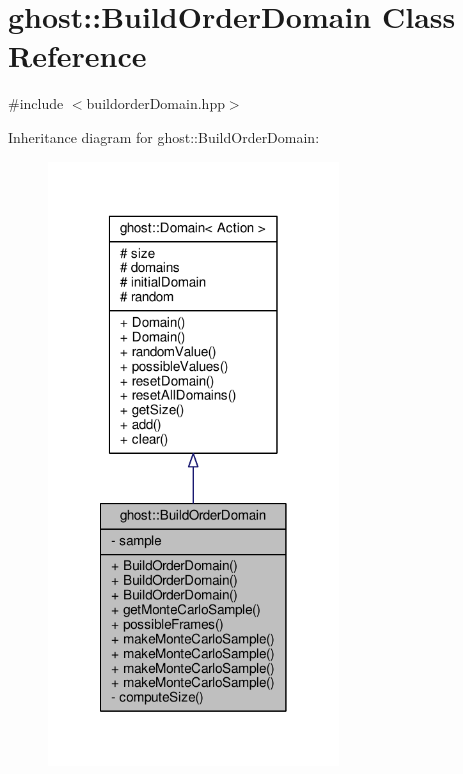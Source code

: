 \hypertarget{classghost_1_1BuildOrderDomain}{\section{ghost\-:\-:Build\-Order\-Domain Class Reference}
\label{classghost_1_1BuildOrderDomain}
}


{\ttfamily \#include $<$buildorder\-Domain.\-hpp$>$}



Inheritance diagram for ghost\-:\-:Build\-Order\-Domain\-:
\nopagebreak
\begin{figure}[H]
\begin{center}
\leavevmode
\includegraphics[width=218pt]{classghost_1_1BuildOrderDomain__inherit__graph}
\end{center}
\end{figure}


